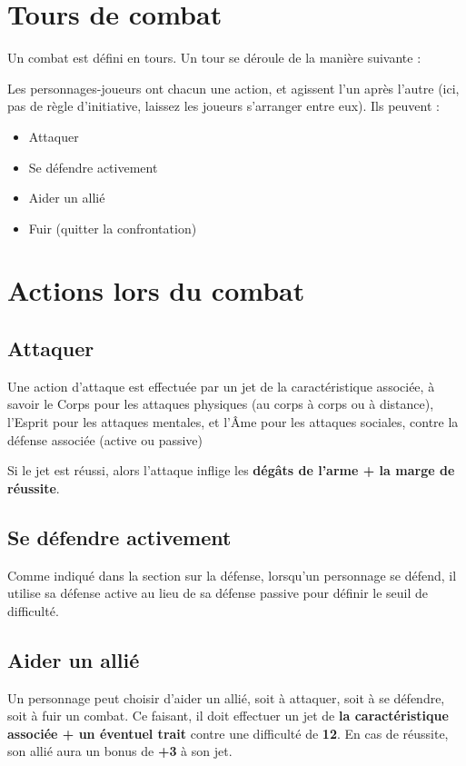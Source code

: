 \documentclass[a4paper,10pt,twoside,twocolumn,openany,bg=print,justified]{dndbook}
\begin{document}
\section{Tours de combat}

Un combat est défini en tours. Un tour se déroule de la manière suivante :

Les personnages-joueurs ont chacun une action, et agissent l'un après l'autre (ici, pas de règle d'initiative, laissez les joueurs s'arranger entre eux). Ils peuvent :

\begin{itemize}
\item Attaquer
\item Se défendre activement
\item Aider un allié
\item Fuir (quitter la confrontation)
\end{itemize}

\section{Actions lors du combat}

\subsection*{Attaquer}

Une action d'attaque est effectuée par un jet de la caractéristique associée, à savoir le Corps pour les attaques physiques (au corps à corps ou à distance), l'Esprit pour les attaques mentales, et l'Âme pour les attaques sociales, contre la défense associée (active ou passive)

Si le jet est réussi, alors l'attaque inflige les \textbf{dégâts de l'arme + la marge de réussite}.

\subsection*{Se défendre activement}

Comme indiqué dans la section sur la défense, lorsqu'un personnage se défend, il utilise sa défense active au lieu de sa défense passive pour définir le seuil de difficulté.

\subsection*{Aider un allié}

Un personnage peut choisir d'aider un allié, soit à attaquer, soit à se défendre, soit à fuir un combat. Ce faisant, il doit effectuer un jet de \textbf{la caractéristique associée + un éventuel trait} contre une difficulté de \textbf{12}. En cas de réussite, son allié aura un bonus de \textbf{+3} à son jet.
\end{document}
